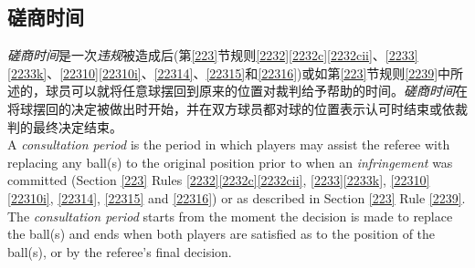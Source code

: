 \subsection{磋商时间}

\noindent \emph{磋商时间}是一次\emph{违规}被造成后(第\ref{223}节规则\ref{2232}\ref{2232c}\ref{2232cii}、\ref{2233}\ref{2233k}、\ref{22310}\ref{22310i}、\ref{22314}、\ref{22315}和\ref{22316})或如第\ref{223}节规则\ref{2239}中所述的，球员可以就将任意球摆回到原来的位置对裁判给予帮助的时间。\emph{磋商时间}在将球摆回的决定被做出时开始，并在双方球员都对球的位置表示认可时结束或依裁判的最终决定结束。\\
A \emph{consultation period} is the period in which players may assist the referee with replacing any ball(s) to the original position prior to when an \emph{infringement} was committed (Section \ref{223} Rules \ref{2232}\ref{2232c}\ref{2232cii}, \ref{2233}\ref{2233k}, \ref{22310}\ref{22310i}, \ref{22314}, \ref{22315} and \ref{22316}) or as described in Section \ref{223} Rule \ref{2239}. The \emph{consultation period} starts from the moment the decision is made to replace the ball(s) and ends when both players are satisfied as to the position of the ball(s), or by the referee's final decision. 
